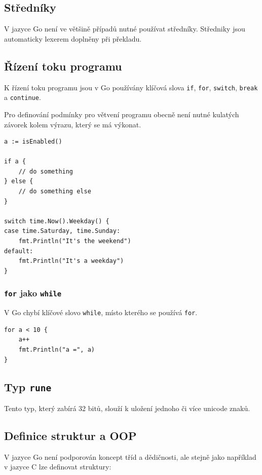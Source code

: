 \documentclass[12pt, a4paper]{article}
\begin{document}
\subsection{Středníky}

V jazyce Go není ve většině případů nutné používat středníky. Středniky jsou automaticky lexerem doplněny při překladu.

\subsection{Řízení toku programu}

K řízení toku programu jsou v Go používány klíčová slova \texttt{if}, \texttt{for}, \texttt{switch}, \texttt{break} a \texttt{continue}.

Pro definování podmínky pro větvení programu obecně není nutné kulatých závorek kolem výrazu, který se má výkonat.

\begin{lstlisting}[caption={Větvení pomocí \texttt{if} a \texttt{switch}}, captionpos=b, language=Golang]
a := isEnabled()

if a {
    // do something
} else {
    // do something else
}

switch time.Now().Weekday() {
case time.Saturday, time.Sunday:
    fmt.Println("It's the weekend")
default:
    fmt.Println("It's a weekday")
}

\end{lstlisting}


\subsubsection{\texttt{for} jako \texttt{while}}
V Go chybí klíčové slovo \texttt{while}, místo kterého se používá \texttt{for}.
\begin{lstlisting}
for a < 10 {
    a++
    fmt.Println("a =", a)
}

\end{lstlisting}

\subsection{Typ \texttt{rune}}

Tento typ, který zabírá 32 bitů, slouží k uložení jednoho či více unicode znaků.

\subsection{Definice struktur a OOP}
V jazyce Go není podporován koncept tříd a dědičnosti, ale stejně jako například v jazyce C lze definovat struktury:
\end{document}

